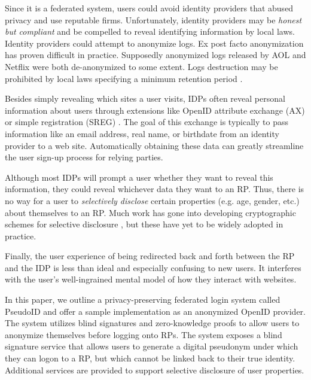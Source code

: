 \documentclass{llncs}
\begin{document}
Since it is a federated system, users could avoid identity providers
that abused privacy and use reputable firms. Unfortunately, identity
providers may be \emph{honest but compliant} and be compelled to
reveal identifying information by local laws. Identity providers could
attempt to anonymize logs. Ex post facto anonymization has proven
difficult in practice. Supposedly anonymized logs released by AOL
\cite{BarZel06} and Netflix \cite{NaSh08} were both de-anonymized to
some extent. Logs destruction may be prohibited by local laws
specifying a minimum retention period \cite{EUDir}.

Besides simply revealing which sites a user visits, IDPs often reveal
personal information about users through extensions like OpenID
attribute exchange (AX) \cite{AX} or simple registration (SREG)
\cite{Sreg}. The goal of this exchange is typically to pass
information like an email address, real name, or birthdate from an
identity provider to a web site. Automatically obtaining these data
can greatly streamline the user sign-up process for relying parties.

Although most IDPs will prompt a user whether they want to reveal this
information, they could reveal whichever data they want to an
RP. Thus, there is no way for a user to \emph{selectively disclose}
certain properties (e.g. age, gender, etc.) about themselves to an
RP. Much work has gone into developing cryptographic schemes for
selective disclosure \cite{CaLy01,CaLy04,CHL05,CaGr08}, but these have
yet to be widely adopted in practice.

Finally, the user experience of being redirected back and forth
between the RP and the IDP is less than ideal and especially confusing
to new users. It interferes with the user's well-ingrained mental
model of how they interact with websites.

In this paper, we outline a privacy-preserving federated login system
called PseudoID and offer a sample implementation as an anonymized
OpenID provider. The system utilizes blind signatures \cite{Cha82} and
zero-knowledge proofs \cite{GMR89} to allow users to anonymize
themselves before logging onto RPs. The system exposes a blind
signature service that allows users to generate a digital pseudonym
under which they can logon to a RP, but which cannot be linked back to
their true identity. Additional services are provided to support
selective disclosure of user properties.

\end{document}
